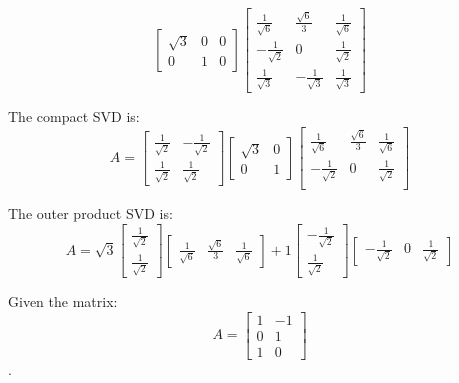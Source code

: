 \begin{enumerate}
{\begin{equation}
      \begin{bmatrix} \sqrt{3} & 0 & 0 \\ 0 & 1 & 0 \end{bmatrix} 
      \begin{bmatrix} \frac{1}{\sqrt{6}} & \frac{\sqrt{6}}{3} & \frac{1}{\sqrt{6}} \\
      -\frac{1}{\sqrt{2}} & 0 & \frac{1}{\sqrt{2}} \\
      \frac{1}{\sqrt{3}} & - \frac{1}{\sqrt{3}} & \frac{1}{\sqrt{3}} \end{bmatrix}
    \end{equation}

    The compact SVD is:
    \begin{equation}
      A = \begin{bmatrix} \frac{1}{\sqrt{2}} & -\frac{1}{\sqrt{2}} \\ \frac{1}{\sqrt{2}} & \frac{1}{\sqrt{2}} \end{bmatrix} 
      \begin{bmatrix} \sqrt{3} & 0 \\ 0 & 1 \end{bmatrix} 
      \begin{bmatrix} \frac{1}{\sqrt{6}} & \frac{\sqrt{6}}{3} & \frac{1}{\sqrt{6}} \\
      -\frac{1}{\sqrt{2}} & 0 & \frac{1}{\sqrt{2}} \\ \end{bmatrix}
    \end{equation}

    The outer product SVD is:
    \begin{equation}
      A = \sqrt{3} \begin{bmatrix} \frac{1}{\sqrt{2}} \\ \frac{1}{\sqrt{2}} \end{bmatrix} \begin{bmatrix} \frac{1}{\sqrt{6}} & \frac{\sqrt{6}}{3} & \frac{1}{\sqrt{6}} \end{bmatrix}
        + 1 \begin{bmatrix} -\frac{1}{\sqrt{2}} \\ \frac{1}{\sqrt{2}} \end{bmatrix} \begin{bmatrix} -\frac{1}{\sqrt{2}} & 0 & \frac{1}{\sqrt{2}} \end{bmatrix}
    \end{equation}
  }

  \newpage
  \qitem Given the matrix: 
  $$A = \begin{bmatrix}
    1 & -1 \\
    0 & 1 \\
    1 & 0
  \end{bmatrix}$$. 


\end{enumerate}
